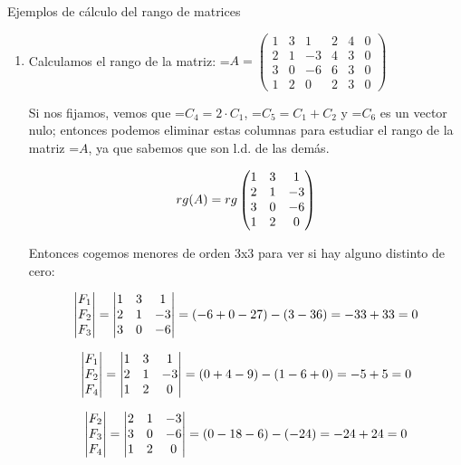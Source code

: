 \documentclass[11pt,a4paper]{article}
\newcommand{\fmm}[1]{\setbox0=\hbox{$#1$}\ifdim\wd0>\linewidth\fmdisp{#1}\else\mbox{\box0}\fi}
\newcommand{\fmdisp}[1]{\[\setbox2=\hbox{$\displaystyle #1$}\ifdim\wd2>\linewidth\resizebox{\linewidth}{!}{\box2}\else\box2\fi\]}
\begin{document}
\begin{fmex}{Ejemplos de cálculo del rango de matrices}
\begin{enumerate}[label=\textbf{\arabic*.},leftmargin=*]
\fmm{\rightarrow} los tres vectores son l.i.
\item Calculamos el rango de la matriz: \fmm{A=\begin{pmatrix}1 & 3 & 1 & 2 & 4 & 0\\ 2 & 1 & -3 & 4 & 3 & 0\\ 3 & 0 & -6 & 6 & 3 & 0\\ 1 & 2 & 0 & 2 & 3 & 0\end{pmatrix}}

Si nos fijamos, vemos que \fmm{C_4=2\cdot C_1}, \fmm{C_5=C_1+C_2} y \fmm{C_6} es un vector nulo; entonces podemos eliminar estas columnas para estudiar el rango de la matriz \fmm{A}, ya que sabemos que son l.d. de las demás.

\fmdisp{rg(A)=rg\begin{pmatrix}1 & 3 & 1\\ 2 & 1 & -3\\ 3 & 0 & -6\\ 1 & 2 & 0\end{pmatrix}}

Entonces cogemos menores de orden 3x3 para ver si hay alguno distinto de cero:

\fmdisp{\begin{vmatrix}F_1\\ F_2\\ F_3\end{vmatrix}=\begin{vmatrix}1 & 3 & 1\\ 2 & 1 & -3\\ 3 & 0 & -6\end{vmatrix}=(-6+0-27)-(3-36)=-33+33=0}

\fmdisp{\begin{vmatrix}F_1\\ F_2\\ F_4\end{vmatrix}=\begin{vmatrix}1 & 3 & 1\\ 2 & 1 & -3\\ 1 & 2 & 0\end{vmatrix}=(0+4-9)-(1-6+0)=-5+5=0}

\fmdisp{\begin{vmatrix}F_2\\ F_3\\ F_4\end{vmatrix}=\begin{vmatrix}2 & 1 & -3\\ 3 & 0 & -6\\ 1 & 2 & 0\end{vmatrix}=(0-18-6)-(-24)=-24+24=0}


\end{enumerate}
\end{fmex}
\end{document}
